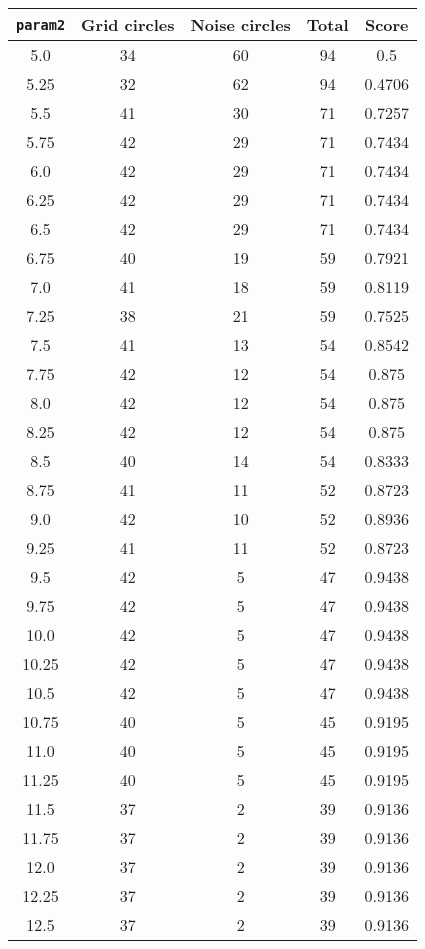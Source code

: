 \documentclass[letterpaper, 12pt]{article}
\begin{document}
\begin{longtable}{|c|c|c|c|c|}
\hline
\textbf{\texttt{param2}} & \textbf{Grid circles} & \textbf{Noise circles} & \textbf{Total} & \textbf{Score} \\
\hline
5.0 & 34 & 60 & 94 & 0.5 \\
\hline
5.25 & 32 & 62 & 94 & 0.4706 \\
\hline
5.5 & 41 & 30 & 71 & 0.7257 \\
\hline
5.75 & 42 & 29 & 71 & 0.7434 \\
\hline
6.0 & 42 & 29 & 71 & 0.7434 \\
\hline
6.25 & 42 & 29 & 71 & 0.7434 \\
\hline
6.5 & 42 & 29 & 71 & 0.7434 \\
\hline
6.75 & 40 & 19 & 59 & 0.7921 \\
\hline
7.0 & 41 & 18 & 59 & 0.8119 \\
\hline
7.25 & 38 & 21 & 59 & 0.7525 \\
\hline
7.5 & 41 & 13 & 54 & 0.8542 \\
\hline
7.75 & 42 & 12 & 54 & 0.875 \\
\hline
8.0 & 42 & 12 & 54 & 0.875 \\
\hline
8.25 & 42 & 12 & 54 & 0.875 \\
\hline
8.5 & 40 & 14 & 54 & 0.8333 \\
\hline
8.75 & 41 & 11 & 52 & 0.8723 \\
\hline
9.0 & 42 & 10 & 52 & 0.8936 \\
\hline
9.25 & 41 & 11 & 52 & 0.8723 \\
\hline
9.5 & 42 & 5 & 47 & 0.9438 \\
\hline
9.75 & 42 & 5 & 47 & 0.9438 \\
\hline
10.0 & 42 & 5 & 47 & 0.9438 \\
\hline
10.25 & 42 & 5 & 47 & 0.9438 \\
\hline
10.5 & 42 & 5 & 47 & 0.9438 \\
\hline
10.75 & 40 & 5 & 45 & 0.9195 \\
\hline
11.0 & 40 & 5 & 45 & 0.9195 \\
\hline
11.25 & 40 & 5 & 45 & 0.9195 \\
\hline
11.5 & 37 & 2 & 39 & 0.9136 \\
\hline
11.75 & 37 & 2 & 39 & 0.9136 \\
\hline
12.0 & 37 & 2 & 39 & 0.9136 \\
\hline
12.25 & 37 & 2 & 39 & 0.9136 \\
\hline
12.5 & 37 & 2 & 39 & 0.9136 \\

\end{longtable}
\end{document}
